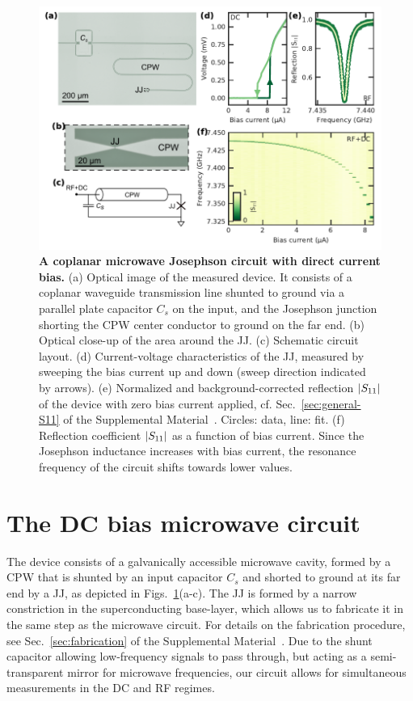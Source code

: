 \begin{figure}
	\centering
	\includegraphics[width=\linewidth]{chapter-currentdetection/figures/Figure1}
	\caption{
		\textbf{A coplanar microwave Josephson circuit with direct current bias.}
		(a) Optical image of the measured device.
		It consists of a coplanar waveguide transmission line shunted to ground via a parallel plate capacitor $C_s$ on the input, and the Josephson junction shorting the CPW center conductor to ground on the far end.
		(b) Optical close-up of the area around the JJ.
		(c) Schematic circuit layout.
		(d) Current-voltage characteristics of the JJ, measured by sweeping the bias current up and down (sweep direction indicated by arrows).
		(e) Normalized and background-corrected reflection $\lvert S_{11}\rvert$ of the device with zero bias current applied, cf. Sec.~\ref{sec:general-S11} of the Supplemental Material~\cite{SeeSupplementalMaterial}.
		Circles: data, line: fit.
		(f) Reflection coefficient $\lvert S_{11}\rvert$ as a function of bias current.
		Since the Josephson inductance increases with bias current, the resonance frequency of the circuit shifts towards lower values.
		\label{fig:figure1}
	}
\end{figure}

\section{The DC bias microwave circuit}

The device consists of a galvanically accessible microwave cavity, formed by a CPW that is shunted by an input capacitor $C_s$ and shorted to ground at its far end by a JJ, as depicted in Figs.~\ref{fig:figure1}(a-c).
% 
The JJ is formed by a narrow constriction in the superconducting base-layer, which allows us to fabricate it in the same step as the microwave circuit.
% 
For details on the fabrication procedure, see Sec.~\ref{sec:fabrication} of the Supplemental Material~\cite{SeeSupplementalMaterial}.
% 
Due to the shunt capacitor allowing low-frequency signals to pass through, but acting as a semi-transparent mirror for microwave frequencies, our circuit allows for simultaneous measurements in the DC and RF regimes.

